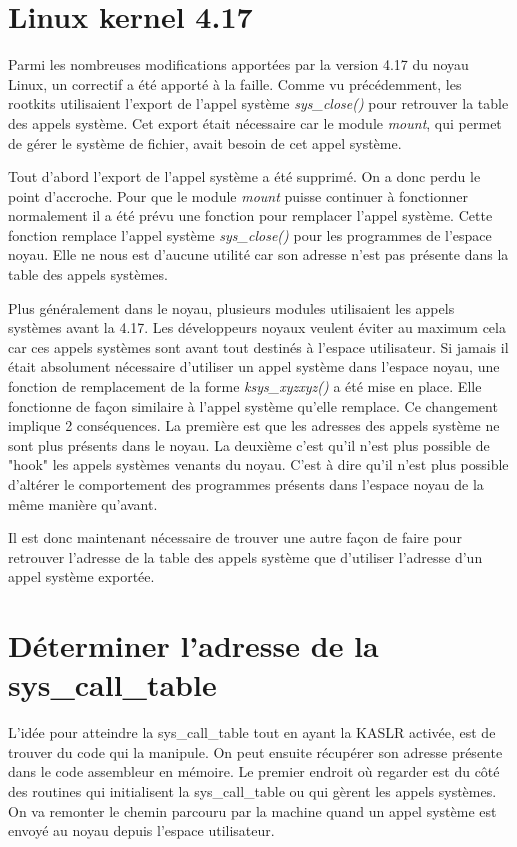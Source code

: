 \documentclass[journal, a4paper]{IEEEtran}
\begin{document}
\section{Linux kernel 4.17}

Parmi les nombreuses modifications apportées par la version 4.17 du noyau Linux, un correctif a été apporté à la faille. Comme vu précédemment, les rootkits utilisaient l'export de l'appel système \textit{sys\_close()} pour retrouver la table des appels système. Cet export était nécessaire car le module \textit{mount}, qui permet de gérer le système de fichier, avait besoin de cet appel système.

Tout d'abord l'export de l'appel système a été supprimé. On a donc perdu le point d'accroche. Pour que le module \textit{mount} puisse continuer à fonctionner normalement il a été prévu une fonction pour remplacer l'appel système. Cette fonction remplace l'appel système \textit{sys\_close()} pour les programmes de l'espace noyau. Elle ne nous est d'aucune utilité car son adresse n'est pas présente dans la table des appels systèmes.

 Plus généralement dans le noyau, plusieurs modules utilisaient les appels systèmes avant la 4.17. Les développeurs noyaux veulent éviter au maximum cela car ces appels systèmes sont avant tout destinés à l'espace utilisateur. Si jamais il était absolument nécessaire d'utiliser un appel système dans l'espace noyau, une fonction de remplacement de la forme \textit{ksys\_xyzxyz()} a été mise en place. Elle fonctionne de façon similaire à l'appel système qu'elle remplace. Ce changement implique 2 conséquences. La première est que les adresses des appels système ne sont plus présents dans le noyau. La deuxième c'est qu'il n'est plus possible de "hook" les appels systèmes venants du noyau. C'est à dire qu'il n'est plus possible d'altérer le comportement des programmes présents dans l'espace noyau de la même manière qu'avant.

Il est donc maintenant nécessaire de trouver une autre façon de faire pour retrouver l'adresse de la table des appels système que d'utiliser l'adresse d'un appel système exportée.

\section{Déterminer l'adresse de la sys\_call\_table}

L'idée pour atteindre la sys\_call\_table tout en ayant la KASLR activée, est de trouver du code qui la manipule. On peut ensuite récupérer son adresse présente dans le code assembleur en mémoire. Le premier endroit où regarder est du côté des routines qui initialisent la sys\_call\_table ou qui gèrent les appels systèmes. On va remonter le chemin parcouru par la machine quand un appel système est envoyé au noyau depuis l'espace utilisateur.
\end{document}
